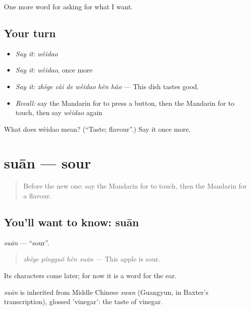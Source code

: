 \begin{grammarlens}[title={What you've built}]
One more word for asking for what I want.
\end{grammarlens}

\subsection*{Your turn}
\begin{itemize}
\raggedright
  \item \emph{Say it:} \emph{wèidao}
  \item \emph{Say it:} \emph{wèidao}, once more
  \item \emph{Say it:} \emph{zhège cài de wèidao hěn hǎo} — This dish tastes good.
  \item \emph{Recall:} say the Mandarin for to press a button, then the Mandarin for to touch, then say \emph{wèidao} again
\end{itemize}

\begin{tcolorbox}[breakable,colback=teal!4,colframe=teal!35!black,title={Before you move on}]
What does wèidao mean? (\textquotedblleft{}Taste; flavour\textquotedblright{}.) Say it once more.
\end{tcolorbox}
\section[suān]{suān — sour}

\label{lesson:ZH-C172-suan}



\begin{quote}
Before the new one: say the Mandarin for to touch, then the Mandarin for a flavour.
\end{quote}

\subsection*{You'll want to know: suān}
\emph{suān} — \textquotedblleft{}sour\textquotedblright{}.

\begin{quote}
\emph{zhège píngguǒ hěn suān} — This apple is sour.
\end{quote}

Its characters come later; for now it is a word for the ear.

\begin{cousinweb}
\emph{suān} is inherited from Middle Chinese \emph{swan} (Guangyun, in Baxter's transcription), glossed 'vinegar': the taste of vinegar.
\end{cousinweb}


